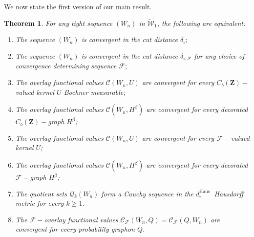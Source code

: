 \documentclass[11pt]{article}
\newtheorem{theorem}{Theorem}[section]
\newtheorem{lemma}[theorem]{Lemma}
\newcommand{\cF}{{\mathcal F}}  %
\newcommand{\Space}{\mathbf{Z}}
\newcommand{\CbFunct}{C_b(\Space)}
\newcommand{\UGraphon}{\widetilde{\mathcal{W}}_1}
\begin{document}


 We now state the first version of our main result.

\begin{theorem}\label{ThmEquivalenceConvQuotientOverlay}
For any tight sequence $\left(W_n\right)$ in $\UGraphon$, the following are equivalent:
\begin{enumerate}

\item  The sequence $\left(W_n\right)$ is convergent in the cut distance $\delta_{\square};$
\item  The sequence $\left(W_n\right)$ is convergent in the cut distance $\delta_{\square,\cF}$ for any choice of convergence determining sequence $\cF;$
\item The overlay functional values $\mathcal{C}\left(W_n, U\right)$ are convergent for every $\CbFunct-$valued kernel $U$ Bochner measurable;
\item The overlay functional values $\mathcal{C}\left(W_n, H^{\beta}\right)$ are convergent for every decorated $\CbFunct-$graph $H^{\beta}$;
\item The overlay functional values $\mathcal{C}\left(W_n, U\right)$ are convergent for every $\cF-$valued kernel $U$;
\item The overlay functional values $\mathcal{C}\left(W_n, H^{\beta}\right)$ are convergent for every decorated $\cF-$graph $H^{\beta}$;
\item The quotient sets $\mathcal{Q}_k\left(W_n\right)$ form a Cauchy sequence in the $d_{\square}^{\text {Haus }}$ Hausdorff metric for every $k \geq 1$.
\item The $\cF-$overlay functional values $\mathcal{C_{\cF}}\left(W_n, Q\right)=\mathcal{C_{\cF}}\left(Q,W_n\right)$ are convergent for every probability graphon $Q.$
\end{enumerate}
\end{theorem}
\proof
\end{document}
